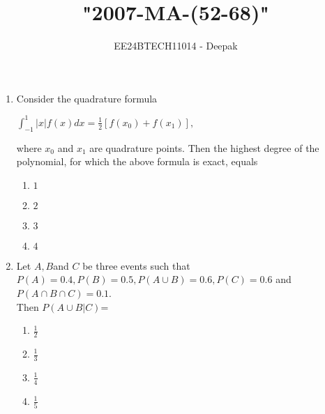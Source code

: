 \documentclass[journal]{IEEEtran}
\theoremstyle{remark}
\begin{document}

\onecolumn

\title{"2007-MA-(52-68)"}
\author{EE24BTECH11014 - Deepak }
\maketitle

\renewcommand{\thefigure}{\theenumi}
\renewcommand{\thetable}{\theenumi}

\begin{enumerate}


    \item Consider the quadrature formula 
    \begin{center}
        $\int_{-1}^{1}|x|f(x)dx=\frac{1}{2}[f(x_{0})+f(x_{1})],$ 
    \end{center}
            
            where $x_0$ and $x_1$ are quadrature points. Then the highest degree of the polynomial, for which the above formula is exact, equals
        
            \begin{multicols}{4}
            \begin{enumerate}
                \item $1$
                \item $2$
                \item $3$
                \item $4$
            \end{enumerate}
            \end{multicols}
            
                \item Let $A,B $and $C$ be three events such that\\
                $P(A)=0.4,P(B)=0.5,P(A\cup B)=0.6,P(C)=0.6$ and $P(A\cap B\cap C)=0.1$. \\
                Then $P(A\cup B|C)$=
                \begin{multicols}{4}
                \begin{enumerate}
                    \item $\frac{1}{2}$
                    \item $\frac{1}{3}$
                    \item $\frac{1}{4}$
                    \item $\frac{1}{5}$
                \end{enumerate}
                \end{multicols}


\end{enumerate}
\end{document}
